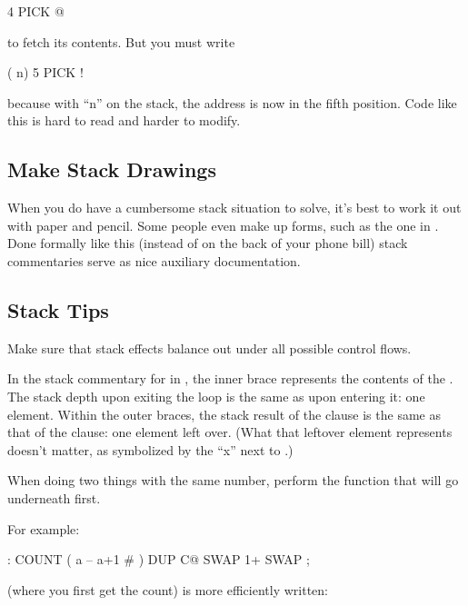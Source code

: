 \begin{Code}
4 PICK @
\end{Code}
to fetch its contents. But you must write

\begin{Code}
( n) 5 PICK !
\end{Code}
because with ``n'' on the stack, the address is now in the fifth position.
Code like this is hard to read and harder to modify.

\subsection{Make Stack Drawings}

When you do have a cumbersome stack situation to solve, it's best to work
it out with paper and pencil. Some people even make up forms, such as the
one in . Done formally like this (instead of on the back of your
phone bill) stack commentaries serve as nice auxiliary documentation.

\subsection{Stack Tips}

\begin{tip}
Make sure that stack effects balance out under all possible control flows.
\end{tip}
In the stack commentary for  in , the inner brace
represents the contents of the . The stack depth upon exiting
the loop is the same as upon entering it: one element. Within the outer
braces, the stack result of the  clause is the same as that of the
 clause: one element left over. (What that leftover element
represents doesn't matter, as symbolized by the ``x'' next to .)



\begin{tip}
When doing two things with the same number, perform the function that
will go underneath first.
\end{tip}
For example:

\begin{Code}
: COUNT  ( a -- a+1 # )  DUP C@  SWAP 1+  SWAP ;
\end{Code}
(where you first get the count) is more efficiently written:

